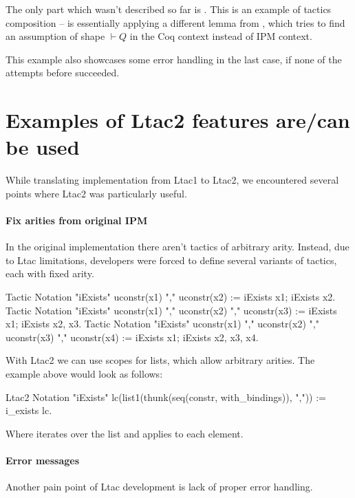 The only part which wasn't described so far is .
This is an example of tactics composition --  is essentially applying a different lemma from , which tries to find an assumption of shape \(\vdash Q\) in the Coq context instead of IPM context.

This example also showcases some error handling in the last case, if none of the attempts before succeeded.

\section{Examples of Ltac2 features are/can be used}

While translating implementation from Ltac1 to Ltac2, we encountered several points where Ltac2 was particularly useful.

\paragraph{Fix arities from original IPM}

In the original implementation there aren't tactics of arbitrary arity.
Instead, due to Ltac limitations, developers were forced to define several variants of tactics, each with fixed arity.

\begin{coq}
Tactic Notation "iExists" uconstr(x1) "," uconstr(x2) :=
  iExists x1; iExists x2.
Tactic Notation "iExists" uconstr(x1) "," uconstr(x2) "," uconstr(x3) :=
  iExists x1; iExists x2, x3.
Tactic Notation "iExists" uconstr(x1) "," uconstr(x2) "," uconstr(x3) ","
    uconstr(x4) :=
  iExists x1; iExists x2, x3, x4.
\end{coq}

With Ltac2 we can use scopes for lists, which allow arbitrary arities.
The example above would look as follows:

\begin{coq}
  Ltac2 Notation "iExists" lc(list1(thunk(seq(constr, with_bindings)), ",")) :=
  i_exists lc.
\end{coq}

Where  iterates over the list and applies  to each element.

\paragraph{Error messages}

Another pain point of Ltac development is lack of proper error handling.

